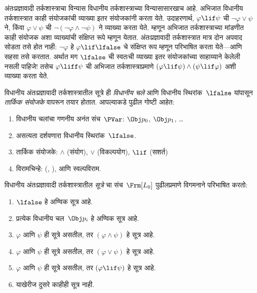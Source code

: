 अंतःप्रज्ञावादी तर्कशास्त्राचा विन्यास विधानीय
तर्कशास्त्राच्या विन्यासासारखाच आहे. अभिजात विधानीय
तर्कशास्त्रात काही संयोजकांची व्याख्या इतर
संयोजकांनी करता येते. उदाहरणार्थ, $\varphi \lif \psi$ ची
$\lnot \varphi \lor \psi$ ने, किंवा $\varphi \lor \psi$ ची
$\lnot(\lnot \varphi \land \lnot \psi)$ ने व्याख्या करता
येते. म्हणून अभिजात तर्कशास्त्राच्या मांडणीत काही
संयोजक अशा व्याख्यांची संक्षिप्त रूपे म्हणून येतात.
अंतःप्रज्ञावादी तर्कशास्त्रात मात्र दोन अपवाद सोडता
तसे होत नाही: $\lnot \varphi$ हे $\varphi \lif \lfalse$ चे
संक्षिप्त रूप म्हणून परिभाषित करता येते---आणि
सहसा तसे करतात. अर्थात मग $\lfalse$ ची स्वतःची
व्याख्या इतर संयोजकांच्या साहाय्याने केलेली नसली पाहिजे!{} तसेच
$\varphi \liff \psi$ ची अभिजात तर्कशास्त्राप्रमाणे
$(\varphi \lif \psi) \land (\psi \lif \varphi)$ अशी व्याख्या
करता येते.

विधानीय अंतःप्रज्ञावादी तर्कशास्त्रातील सूत्रे
ही \emph{विधानीय चले} आणि विधानीय
स्थिरांक~$\lfalse$ यांपासून \emph{तार्किक संयोजके}
वापरून तयार होतात. आपल्याकडे पुढील गोष्टी आहेत:

\begin{enumerate}
\item विधानीय चलांचा गणनीय अनंत संच~$\PVar$: $\Obj p_0$,
  $\Obj p_1$, \dots
  \item असत्यता दर्शवणारा विधानीय स्थिरांक~$\lfalse$.
\item तार्किक संयोजके: $\land$
  (संयोग), $\lor$ (विकल्पयोग), $\lif$ (सशर्त)
\item विरामचिन्हे: (, ), आणि स्वल्पविराम.
\end{enumerate}

\begin{defn}[सूत्र]
\label{int:int:syn:defn:formulas} विधानीय अंतःप्रज्ञावादी
तर्कशास्त्रातील \emph{सूत्रे} चा संच~$\Frm[L_0]$
पुढीलप्रमाणे विगमनाने परिभाषित करतो:
\begin{enumerate}
\item $\lfalse$ हे अण्विक सूत्र आहे.

\item प्रत्येक विधानीय चल~$\Obj p_i$ हे अण्विक
  सूत्र आहे.

\item $\varphi$ आणि $\psi$ ही सूत्रे असतील, तर $(\varphi \land
  \psi)$ हे सूत्र आहे.

\item $\varphi$ आणि $\psi$ ही सूत्रे असतील, तर $(\varphi \lor \psi)$
  हे सूत्र आहे.

\item $\varphi$ आणि $\psi$ ही सूत्रे असतील, तर $(\varphi \lif \psi)$
  हे सूत्र आहे.

\item याखेरीज दुसरे काहीही सूत्र नाही.
\end{enumerate}
\end{defn}

